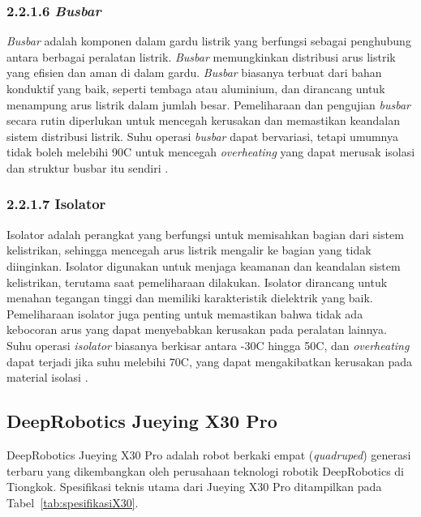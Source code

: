 \subsubsection{2.2.1.6 \emph{Busbar}}
\emph{Busbar} adalah komponen dalam gardu listrik yang berfungsi sebagai penghubung antara berbagai peralatan listrik. \emph{Busbar} memungkinkan distribusi arus listrik yang efisien dan aman di dalam gardu. \emph{Busbar} biasanya terbuat dari bahan konduktif yang baik, seperti tembaga atau aluminium, dan dirancang untuk menampung arus listrik dalam jumlah besar. Pemeliharaan dan pengujian \emph{busbar} secara rutin diperlukan untuk mencegah kerusakan dan memastikan keandalan sistem distribusi listrik. Suhu operasi \emph{busbar} dapat bervariasi, tetapi umumnya tidak boleh melebihi 90\textdegree{}C untuk mencegah \emph{overheating} yang dapat merusak isolasi dan struktur busbar itu sendiri \cite{Telaumbanua2024}.

\subsubsection{2.2.1.7 Isolator}
Isolator adalah perangkat yang berfungsi untuk memisahkan bagian dari sistem kelistrikan, sehingga mencegah arus listrik mengalir ke bagian yang tidak diinginkan. Isolator digunakan untuk menjaga keamanan dan keandalan sistem kelistrikan, terutama saat pemeliharaan dilakukan. Isolator dirancang untuk menahan tegangan tinggi dan memiliki karakteristik dielektrik yang baik. Pemeliharaan isolator juga penting untuk memastikan bahwa tidak ada kebocoran arus yang dapat menyebabkan kerusakan pada peralatan lainnya. Suhu operasi \emph{isolator} biasanya berkisar antara -30\textdegree{}C hingga 50\textdegree{}C, dan \emph{overheating} dapat terjadi jika suhu melebihi 70\textdegree{}C, yang dapat mengakibatkan kerusakan pada material isolasi \cite{Moreno2017}.

\subsection{DeepRobotics Jueying X30 Pro}
DeepRobotics Jueying X30 Pro adalah robot berkaki empat (\textit{quadruped}) generasi terbaru yang dikembangkan oleh perusahaan teknologi robotik DeepRobotics di Tiongkok. Spesifikasi teknis utama dari Jueying X30 Pro ditampilkan pada Tabel~\ref{tab:spesifikasiX30}.


